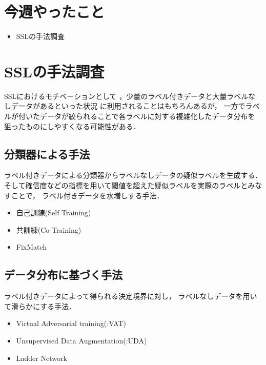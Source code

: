 \documentclass[twocolumn]{jarticle}     %
\begin{document}


\section{今週やったこと}
\begin{itemize}
 	\item SSLの手法調査
\end{itemize}


\section{SSLの手法調査}
SSLにおけるモチベーションとして
，少量のラベル付きデータと大量ラベルなしデータがあるといった状況
に利用されることはもちろんあるが，
一方でラベルが付いたデータが絞られることで各ラベルに対する複雑化したデータ分布を
狙ったものにしやすくなる可能性がある．

\subsection{分類器による手法}
ラベル付きデータによる分類器からラベルなしデータの疑似ラベルを生成する．
そして確信度などの指標を用いて閾値を超えた疑似ラベルを実際のラベルとみなすことで，
ラベル付きデータを水増しする手法．
\begin{itemize}
	\item 自己訓練(Self Training)
	\item 共訓練(Co-Training)
	\item FixMatch
\end{itemize}

\subsection{データ分布に基づく手法}
ラベル付きデータによって得られる決定境界に対し，
ラベルなしデータを用いて滑らかにする手法．
\begin{itemize}
	\item Virtual Adversarial training(:VAT)
	\item Unsupervised Data Augmentation(:UDA)
	\item Ladder Network
\end{itemize}
\end{document}
